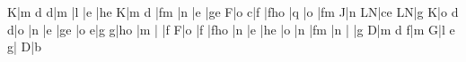 \temps\NOtes {}\bohlp K|\hu m\enotes
\temps\NOtes{}\qu d\enotes
\temps\NOtes{}\qu d|\qu m\enotes
\barre\NOtes {}|\hup l\enotes
\temps\NOtes{}|\qu e\enotes
\temps\NOtes{}|\zq h\qu e\enotes
\barre\NOtes {}\bohlp K|\hu m\enotes
\temps\NOtes{}\qu d\enotes
\temps\NOtes{}|\zql f\qu m\enotes
\barre\NOtes {}|\hup n\enotes
\temps\NOtes{}|\qu e\enotes
\temps\NOtes{}|\zq g\qu e\enotes
\barre\NOtes {}\bohup F|\hu o\enotes
\temps\NOtes{}\qu c|\qu f\enotes
\temps\NOtes{}|\zql f\zq h\qu o\enotes
\barre\NOtes {}|\qu q\enotes
\temps\NOtes{}|\qu o\enotes
\temps\NOtes{}|\zql f\qu m\enotes
\barre\NOtes {}\bohlp J|\hu n\enotes 
\temps\NOtes\zq L\qu N|\zq c\qu e\enotes 
\temps\NOtes\zq L\qu N|\qu g\enotes
\barre\NOtes {}\bohlp K|\hu o\enotes
\temps\NOtes{}\qu d\enotes
\temps\NOtes{}\qu d|\qu o\enotes
\barre\NOtes {}|\hup n\enotes
\temps\NOtes{}|\qu e\enotes
\temps\NOtes{}|\zq g\qu e\enotes
\barre\NOtes {}|\hu o\enotes
\temps\NOtes{}\qu e|\qu g\enotes
\temps\NOtes{}\qu g|\zql h\qu o\enotes
\barre\NOtes {}|\hup m\enotes
\temps\NOtes{}|\enotes
\temps\NOtes{}|\qu f\enotes
\barre\NOtes {}\bohup F|\hu o\enotes
\temps\NOtes{}|\zql f\enotes
\temps\NOtes{}|\zq f\zql h\qu o\enotes
\barre\NOtes {}|\hup n\enotes
\temps\NOtes{}|\qu e\enotes
\temps\NOtes{}|\zq h\ql e\enotes
\barre\NOtes {}|\qu o\enotes
\temps\NOtes{}|\qu n\enotes
\temps\NOtes{}|\zq f\qu m\enotes
\barre\NOtes {}|\hu n\enotes
\temps\NOtes{}|\enotes
\temps\NOtes{}|\ql g\enotes
\barre\NOtes {}\bohup D|\hu m\enotes
\temps\NOtes{}\qu d\enotes
\temps\NOtes{}\qu f|\qu m\enotes
\barre\NOtes {}\bohlp G|\hup l\enotes
\temps\NOtes{}\qu e\enotes
\temps\NOtes{}\qu g|\enotes
\barre\NOtes {}\bohup D|\zcharnote b{\CREsc}\enotes
